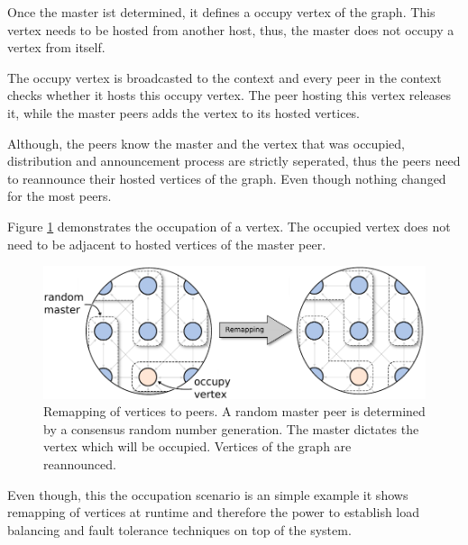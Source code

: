 Once the master ist determined, it defines a occupy vertex of the
graph. This vertex needs to be hosted from another host, thus,
the master does not occupy a vertex from itself.

The occupy vertex is broadcasted to the context and every peer in
the context checks whether it hosts this occupy vertex. The peer
hosting this vertex releases it, while the master peers adds the vertex
to its hosted vertices.

Although, the peers know the master and the vertex that was
occupied, distribution and announcement process are strictly
seperated, thus the peers need to reannounce their hosted vertices
of the graph. Even though nothing changed for the most peers.


Figure \ref{fig:gol_remapping} demonstrates the occupation of a
vertex.  The occupied vertex does not need to be adjacent to hosted
vertices of the master peer.

  \begin{figure}[H]
    \centering
    \includegraphics[width=\textwidth]{graphics/40_gol_remapping}
    \caption{Remapping of vertices to peers. A random master peer is
      determined by a consensus random number generation. The master
      dictates the vertex which will be occupied. Vertices of the
      graph are reannounced.}
    \label{fig:gol_remapping}
  \end{figure}



Even though, this the occupation scenario is an simple example it
shows remapping of vertices at runtime and therefore the power
to establish load balancing and fault tolerance techniques on
top of the system.

\cleardoublepage

